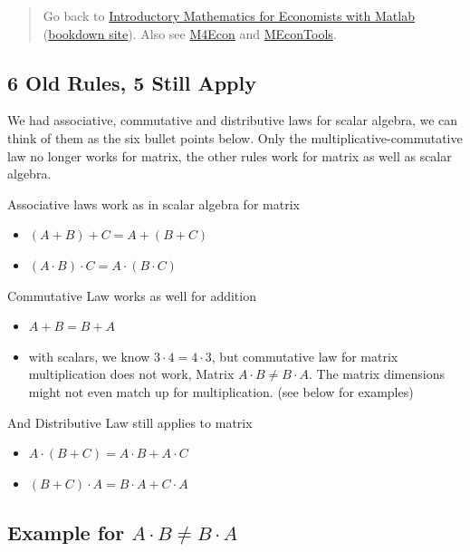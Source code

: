 \documentclass[
]{book}
\begin{document}
\begin{quote}
Go back to \href{https://math4econ.github.io/}{Introductory Mathematics for Economists with Matlab} (\href{https://math4econ.github.io/bookdown}{bookdown site}). Also see \href{http://fanwangecon.github.io/M4Econ}{M4Econ} and \href{https://fanwangecon.github.io/MEconTools/}{MEconTools}.
\end{quote}

\hypertarget{old-rules-5-still-apply}{%
\subsection{6 Old Rules, 5 Still Apply}\label{old-rules-5-still-apply}}

We had associative, commutative and distributive laws for scalar
algebra, we can think of them as the six bullet points below. Only the
multiplicative-commutative law no longer works for matrix, the other
rules work for matrix as well as scalar algebra.

Associative laws work as in scalar algebra for matrix

\begin{itemize}
\item
  \(\displaystyle (A+B)+C=A+(B+C)\)
\item
  \(\displaystyle (A\cdot B)\cdot C=A\cdot (B\cdot C)\)
\end{itemize}

Commutative Law works as well for addition

\begin{itemize}
\item
  \(\displaystyle A+B=B+A\)
\item
  with scalars, we know \(3\cdot 4=4\cdot 3\), but commutative law for
  matrix multiplication does not work, Matrix
  \(A\cdot B\not= B\cdot A\). The matrix dimensions might not even match
  up for multiplication. (see below for examples)
\end{itemize}

And Distributive Law still applies to matrix

\begin{itemize}
\item
  \(\displaystyle A\cdot (B+C)=A\cdot B+A\cdot C\)
\item
  \(\displaystyle (B+C)\cdot A=B\cdot A+C\cdot A\)
\end{itemize}

\hypertarget{example-for-acdot-bnot-bcdot-a}{%
\subsection{\texorpdfstring{Example for \(A\cdot B\not= B\cdot A\)}{Example for A\textbackslash cdot B\textbackslash not= B\textbackslash cdot A}}\label{example-for-acdot-bnot-bcdot-a}}
\end{document}
